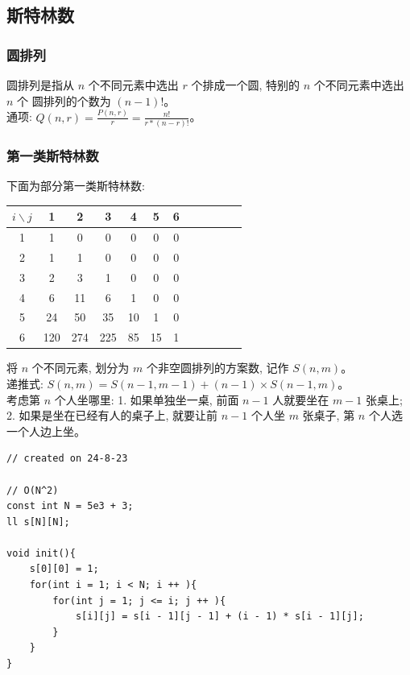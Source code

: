 \documentclass[a4paper,12pt]{article}
\begin{document}
\subsection{斯特林数}

\subsubsection{圆排列}

\noindent 圆排列是指从 $n$ 个不同元素中选出 $r$ 个排成一个圆, 特别的 $n$ 个不同元素中选出 $n$ 个
圆排列的个数为 $(n - 1)!$。 \\

\noindent 通项: $Q(n,r) = \frac{P(n,r)}{r} = \frac{n!}{r*(n-r)!}$。

\subsubsection{第一类斯特林数}

\noindent 下面为部分第一类斯特林数:

\begin{table}[ht]
    \centering
    \begin{tabular}{c|ccccccccccc}
      \( i \backslash j \) & 1 & 2 & 3 & 4 & 5 & 6 \\
      \hline
      1 & 1 & 0 & 0 & 0 & 0 & 0 \\
      2 & 1 & 1 & 0 & 0 & 0 & 0\\
      3 & 2 & 3 & 1 & 0 & 0 & 0\\
      4 & 6 & 11 & 6 & 1 & 0 & 0\\
      5 & 24 & 50 & 35 & 10 & 1 & 0 \\
      6 & 120 & 274 & 225 & 85 & 15 & 1 \\ 

    \end{tabular}
\end{table}

\noindent 将 $n$ 个不同元素, 划分为 $m$ 个非空圆排列的方案数, 记作 $S(n,m)$。 \\

\noindent 递推式: $S(n,m) = S(n-1,m-1) + (n-1) \times S(n-1,m)$。 \\

\noindent 考虑第 $n$ 个人坐哪里: 1. 如果单独坐一桌, 前面 $n-1$ 人就要坐在 $m-1$ 张桌上;
2. 如果是坐在已经有人的桌子上, 就要让前 $n-1$ 个人坐 $m$ 张桌子, 第 $n$ 个人选一个人边上坐。\\


\begin{lstlisting}
// created on 24-8-23

// O(N^2)
const int N = 5e3 + 3;
ll s[N][N];

void init(){
    s[0][0] = 1;
    for(int i = 1; i < N; i ++ ){
        for(int j = 1; j <= i; j ++ ){
            s[i][j] = s[i - 1][j - 1] + (i - 1) * s[i - 1][j];
        }
    }
}
\end{lstlisting}
\end{document}
